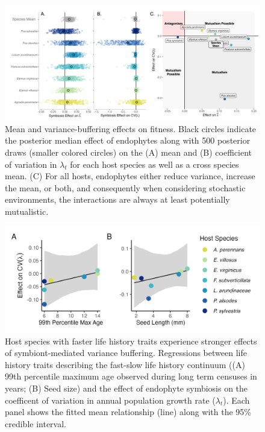 \documentclass[lineno, sn-basic]{sn-jnl}%
\begin{document}
\begin{figure}
	\centering
	\includegraphics[width =\linewidth]{StochDemo_newFig3.png}
	\caption[Mean and variance-buffering effects on fitness]{Mean and variance-buffering effects on fitness. Black circles indicate the posterior median effect of endophytes along with 500 posterior draws (smaller colored circles) on the (A) mean and (B) coefficient of variation in $\lambda_{t}$ for each host species as well as a cross species mean. (C) For all hosts, endophytes either reduce variance, increase the mean, or both, and consequently when considering stochastic environments, the interactions are always at least potentially mutualistic.}
\end{figure}

\begin{figure}
	\centering
	\includegraphics[width=.8\linewidth]{StochDemo_fig4new.png}
	\caption[Host species with faster life history traits experience stronger effects of symbiont-mediated variance buffering]{Host species with faster life history traits experience stronger effects of symbiont-mediated variance buffering. Regressions between life history traits describing the fast-slow life history continuum ((A) 99th percentile maximum age observed during long term censuses in years; (B) Seed size) and the effect of endophyte symbiosis on the coefficent of variation in annual population growth rate ($\lambda_{t}$). Each panel shows the fitted mean relationship (line) along with the 95\% credible interval.}
\end{figure}
\end{document}
